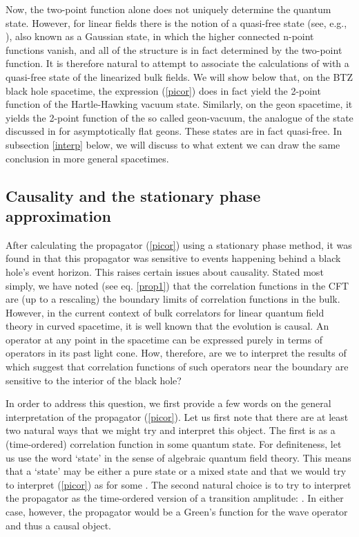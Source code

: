 \documentclass[a4paper,12pt]{article}
\begin{document}
Now, the two-point function alone does not uniquely determine the
quantum state.  However, for linear fields there is the notion of a
quasi-free state (see, e.g., \cite{RMW}), also known as a Gaussian
state, in which the higher connected n-point functions vanish, and all
of the structure is in fact determined by the two-point function.  It
is therefore natural to attempt to associate the calculations of
\cite{holopart} with a quasi-free state of the linearized bulk fields.
We will show below that, on the BTZ black hole spacetime, the
expression (\ref{picor}) does in fact yield the 2-point function of
the Hartle-Hawking vacuum state.  Similarly, on the \coordHE{} geon spacetime, it yields the 2-point function of the so called
geon-vacuum, the analogue of the state discussed in \cite{LM} for
asymptotically flat geons.  These states are in fact quasi-free.  In
subsection \ref{interp} below, we will discuss to what extent we can
draw the same conclusion in more general spacetimes.

\subsection{Causality and the stationary phase approximation}
\label{state}

After calculating the propagator (\ref{picor}) using a stationary
phase method, it was found in \cite{holopart} that this propagator was
sensitive to events happening behind a black hole's event horizon.
This raises certain issues about causality.  Stated most simply, we
have noted (see eq. \ref{prop1}) that the correlation functions in the
CFT are (up to a rescaling) the boundary limits of correlation
functions in the bulk.  However, in the current context of bulk
correlators for linear quantum field theory in curved spacetime, it is
well known that the evolution is causal.  An operator at any point in
the spacetime can be expressed purely in terms of operators in its
past light cone.  How, therefore, are we to interpret the results of
\cite{holopart} which suggest that correlation functions of such
operators near the boundary are sensitive to the interior of the black
hole?

In order to address this question, we first provide a few words on the
general interpretation of the propagator (\ref{picor}).  Let us first
note that there are at least two natural ways that we might try and
interpret this object.  The first is as a (time-ordered) correlation
function in some quantum state.  For definiteness, let us use the word
`state' in the sense of algebraic quantum field theory.  This means
that a `state' \myHighlight{$\rho$}\coordHE{} may be either a pure state or a mixed state and
that we would try to interpret (\ref{picor}) as \coordHE{} for some \myHighlight{$\rho$}\coordHE{}.  The second natural choice
is to try to interpret the propagator as the time-ordered version of a
transition amplitude: \coordHE{}.  In either case, however, the propagator would be a Green's
function for the wave operator and thus a causal object.
\end{document}
